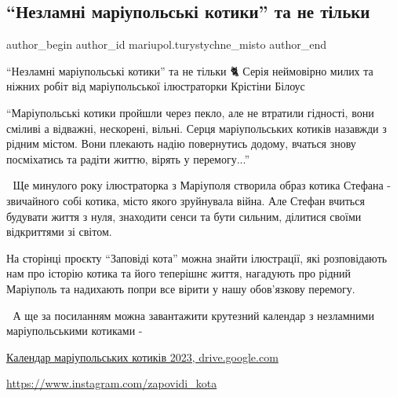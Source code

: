  
 
 
 
 

\subsection{\enquote{Незламні маріупольські котики} та не тільки}
\label{sec:11_04_2023.fb.mariupol.turystychne_misto.1.kotiki}

\ifcmt
 author_begin
   author_id mariupol.turystychne_misto
 author_end
\fi

\enquote{Незламні маріупольські котики} та не тільки 🐈 Серія неймовірно милих та
ніжних робіт від маріупольської ілюстраторки Крістіни Білоус 

\enquote{Маріупольські котики пройшли через пекло, але не втратили гідності, вони
сміливі а відважні, нескорені, вільні. Серця маріупольських котиків назавжди з
рідним містом. Вони плекають надію повернутись додому, вчаться знову
посміхатись та радіти життю, вірять у перемогу...}

🎨 Ще минулого року ілюстраторка з Маріуполя створила образ котика Стефана -
звичайного собі котика, місто якого зруйнувала війна. Але Стефан вчиться
будувати життя з нуля, знаходити сенси та бути сильним, ділитися своїми
відкриттями зі світом.

На сторінці проєкту \enquote{Заповіді кота} можна знайти ілюстрації, які розповідають
нам про історію котика та його теперішнє життя, нагадують про рідний Маріуполь
та надихають попри все вірити у нашу обов'язкову перемогу.

📆 А ще за посиланням можна завантажити крутезний календар з незламними
маріупольськими котиками - 

\href{https://drive.google.com/drive/folders/1HOlAoBdtkUmFNcjZgeTFRY8ZnhmxiMMc}{%
Календар маріупольських котиків 2023, drive.google.com%
}

\url{https://www.instagram.com/zapovidi_kota}
